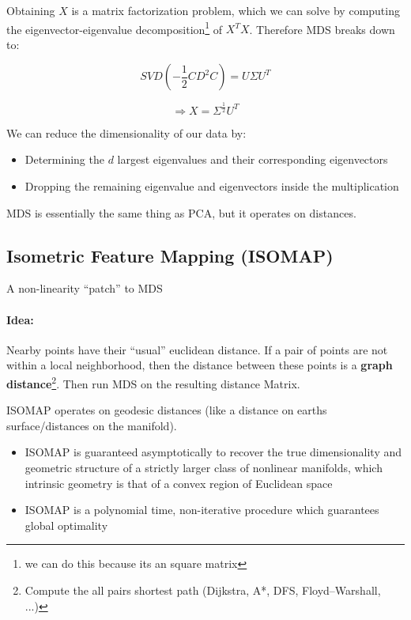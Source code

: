 Obtaining $X$ is a matrix factorization problem, which we can solve by computing the eigenvector-eigenvalue decomposition\footnote{we can do this because its an square matrix} of \(X^T X\). Therefore MDS breaks down to:

\[ \boxed{SVD(-\frac{1}{2} C D^2 C) = U \Sigma U^T}\]

\[ \Rightarrow X = \Sigma^{\frac{1}{2}} U^T \]

We can reduce the dimensionality of our data by:
\begin{itemize}
    \item Determining the \(d\) largest eigenvalues and their corresponding eigenvectors
    \item Dropping the remaining eigenvalue and eigenvectors inside the multiplication
\end{itemize}

MDS is essentially the same thing as PCA, but it operates on distances.


\subsection*{Isometric Feature Mapping (ISOMAP)}
A non-linearity ``patch'' to MDS

\paragraph{Idea:} Nearby points have their ``usual'' euclidean distance. If a pair of points are not within a local neighborhood, then the distance between these points is a \textbf{graph distance}\footnote{Compute the all pairs shortest path (Dijkstra, A*,  DFS, Floyd–Warshall, ...)}. Then run MDS on the resulting distance Matrix.

ISOMAP operates on geodesic distances (like a distance on earths surface/distances on the manifold).

\begin{itemize}
	\item ISOMAP is guaranteed asymptotically to recover the true dimensionality and geometric structure of a strictly larger class of nonlinear manifolds, which intrinsic geometry is that of a convex region of Euclidean space
	\item ISOMAP is a polynomial time, non-iterative procedure which guarantees global optimality
\end{itemize}
